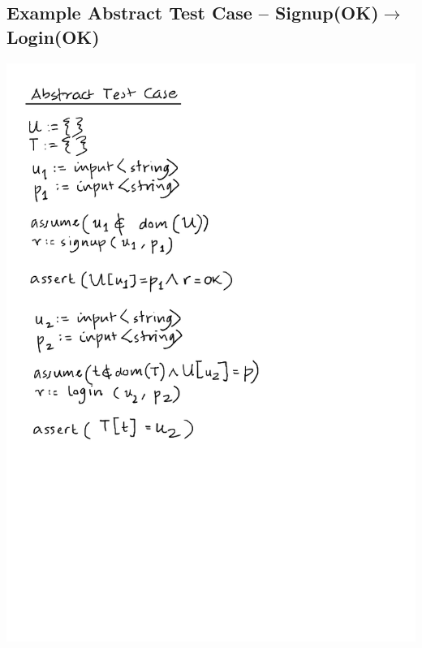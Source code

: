 \documentclass[12pts, a4paper]{article}
\begin{document}
\subsection{Example Abstract Test Case -- Signup(OK)$\rightarrow$Login(OK)}
\begin{center}
\includegraphics[width=\textwidth]{../images/spec-AST-9.png}
\end{center}
\end{document}
